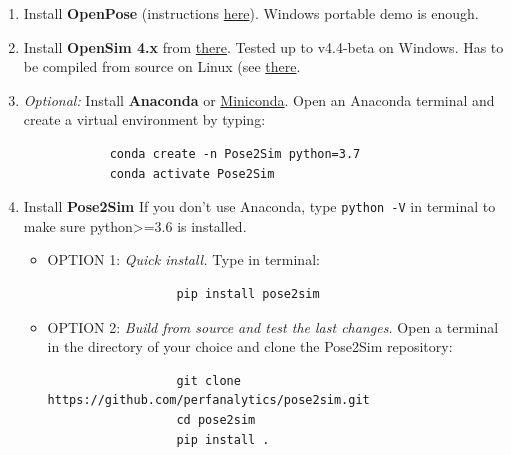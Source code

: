 \begin{enumerate}[itemsep=0em, topsep=0em, leftmargin=*]
      \item Install \textbf{OpenPose} (instructions \href{https://github.com/CMU-Perceptual-Computing-Lab/openpose/blob/master/doc/installation/0_index.md}{here}).\newline
      Windows portable demo is enough.
      \item Install \textbf{OpenSim 4.x} from \href{https://simtk.org/frs/index.php?group_id=91}{there}.\newline
      Tested up to v4.4-beta on Windows. Has to be compiled from source on Linux (see \href{https://simtk-confluence.stanford.edu:8443/display/OpenSim/Linux+Support}{there}.
      \item \textit{Optional:} Install \textbf{Anaconda} or \href{https://docs.conda.io/en/latest/miniconda.html}{Miniconda}.\newline
      Open an Anaconda terminal and create a virtual environment by typing:
      \begin{verbatim}
            conda create -n Pose2Sim python=3.7
            conda activate Pose2Sim
      \end{verbatim}
      \item Install \textbf{Pose2Sim}\newline
      If you don't use Anaconda, type \texttt{python -V} in terminal to make sure python>=3.6 is installed.
      \begin{itemize}
            \item OPTION 1: \textit{Quick install.} Type in terminal:
            \begin{verbatim}
                  pip install pose2sim
            \end{verbatim}
            \item OPTION 2: \textit{Build from source and test the last changes.} Open a terminal in the directory of your choice and clone the Pose2Sim repository:
            \begin{verbatim}
                  git clone https://github.com/perfanalytics/pose2sim.git
                  cd pose2sim
                  pip install .
            \end{verbatim}
      \end{itemize}
\end{enumerate}



